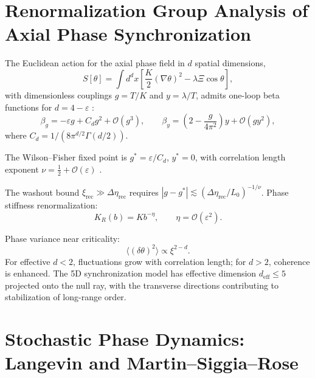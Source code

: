 \documentclass[12pt]{article}
\theoremstyle{definition}
\newcommand{\Wrec}{\Delta\eta_{\mathrm{rec}}}
\newcommand{\xirec}{\xi_{\mathrm{rec}}}
\begin{document}
\section{Renormalization Group Analysis of Axial Phase Synchronization}
\label{app:RG}

The Euclidean action for the axial phase field in $d$ spatial dimensions,
\begin{equation}
  S[\theta]=\int d^dx
  \left[\frac{K}{2}(\nabla\theta)^2-\lambda\Xi\cos\theta\right],
\end{equation}
with dimensionless couplings $g=T/K$ and $y=\lambda/T$,
admits one-loop beta functions for $d=4-\varepsilon$
\cite{Goldenfeld1992,Wilson1974}:
\begin{equation}
  \beta_g = -\varepsilon g + C_d g^2 + \mathcal{O}(g^3),
  \qquad
  \beta_y = \left(2-\frac{g}{4\pi^2}\right)y + \mathcal{O}(gy^2),
\end{equation}
where $C_d=1/(8\pi^{d/2}\Gamma(d/2))$.

The Wilson--Fisher fixed point is $g^\ast=\varepsilon/C_d$, $y^\ast=0$,
with correlation length exponent $\nu=\tfrac{1}{2}+\mathcal{O}(\varepsilon)$
\cite{Zinn-Justin2002}.

The washout bound $\xirec\gg\Wrec$ requires
$|g-g^\ast|\lesssim(\Wrec/L_0)^{-1/\nu}$.
Phase stiffness renormalization:
\begin{equation}
  K_R(b)=Kb^{-\eta},
  \qquad
  \eta=\mathcal{O}(\varepsilon^2).
\end{equation}

Phase variance near criticality:
\begin{equation}
  \langle(\delta\theta)^2\rangle\propto\xi^{2-d}.
\end{equation}
For effective $d<2$, fluctuations grow with correlation length;
for $d>2$, coherence is enhanced.
The 5D synchronization model has effective dimension $d_{\mathrm{eff}}\leq5$
projected onto the null ray, with the transverse directions contributing
to stabilization of long-range order.

\section{Stochastic Phase Dynamics: Langevin and Martin--Siggia--Rose}
\label{app:MSR}
\end{document}

